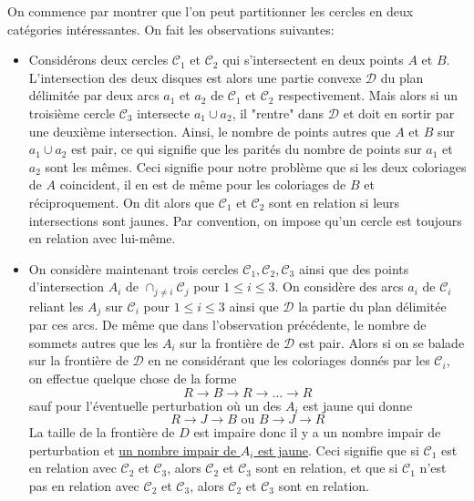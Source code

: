 \begin{sol}
On commence par montrer que l'on peut partitionner les cercles en deux catégories intéressantes. On fait les observations suivantes:

\begin{itemize}
    \item Considérons deux cercles $\mathcal{C}_1$ et $\mathcal{C}_2$ qui s'intersectent en deux points $A$ et $B$. L'intersection des deux disques est alors une partie convexe $\mathcal{D}$ du plan délimitée par deux arcs $a_1$ et $a_2$ de $\mathcal{C}_1$ et $\mathcal{C}_2$ respectivement. Mais alors si un troisième cercle $\mathcal{C}_3$ intersecte $a_1\cup a_2$, il "rentre" dans $\mathcal{D}$ et doit en sortir par une deuxième intersection. Ainsi, le nombre de points autres que $A$ et $B$ sur $a_1\cup a_2$ est pair, ce qui signifie que les parités du nombre de points sur $a_1$ et $a_2$ sont les mêmes. Ceci signifie pour notre problème que si les deux coloriages de $A$ coincident, il en est de même pour les coloriages de $B$ et réciproquement. On dit alors que $\mathcal{C}_1$ et $\mathcal{C}_2$ sont en relation si leurs intersections sont jaunes. Par convention, on impose qu'un cercle est toujours en relation avec lui-même.
    \item On considère maintenant trois cercles $\mathcal{C}_1,\mathcal{C}_2,\mathcal{C}_3$ ainsi que des points d'intersection $A_i$ de $\cap_{j\ne i}\mathcal{C}_j$ pour $1\le i\le 3$. On considère des arcs $a_i$ de $\mathcal{C}_i$ reliant les $A_j$ sur $\mathcal{C}_i$ pour $1\le i\le 3$ ainsi que $\mathcal{D}$ la partie du plan délimitée par ces arcs. De même que dans l'observation précédente, le nombre de sommets autres que les $A_i$ sur la frontière de $\mathcal{D}$ est pair. Alors si on se balade sur la frontière de $\mathcal{D}$ en ne considérant que les coloriages donnés par les $\mathcal{C}_i$, on effectue quelque chose de la forme 
    $$R \rightarrow B \rightarrow R \rightarrow \ldots\rightarrow R$$
    sauf pour l'éventuelle perturbation où un des $A_i$ est jaune qui donne
    $$R\rightarrow J \rightarrow B\text{ ou } B\rightarrow J \rightarrow R$$
    La taille de la frontière de $D$ est impaire donc il y a un nombre impair de perturbation et \underline{un nombre impair de $A_i$ est jaune}. Ceci signifie que si $\mathcal{C}_1$ est en relation avec $\mathcal{C}_2$ et $\mathcal{C}_3$, alors $\mathcal{C}_2$ et $\mathcal{C}_3$ sont en relation, et que si $\mathcal{C}_1$ n'est pas en relation avec $\mathcal{C}_2$ et $\mathcal{C}_3$, alors $\mathcal{C}_2$ et $\mathcal{C}_3$ sont en relation.
    

\end{itemize}
\end{sol}
